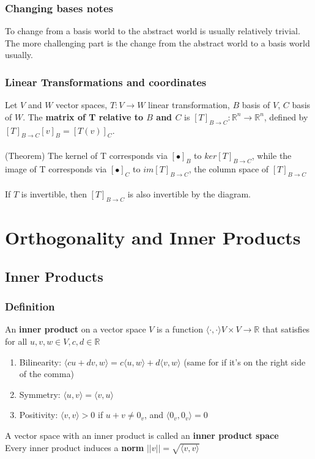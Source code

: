 \documentclass{article}
\begin{document}
\subsubsection{Changing bases notes} %
To change from a basis world to the abstract world is usually relatively trivial. The more challenging part is the change from the abstract world to a basis world usually.
\subsubsection{Linear Transformations and coordinates} %
Let $V$ and $W$ vector spaces, $T:V\rightarrow W$ linear transformation, $B$ basis of $V$, $C$ basis of $W$. The \textbf{matrix of T relative to $B$ and $C$} is $[T]_{B\rightarrow C}:\mathds{R}^n\rightarrow\mathds{R}^n$, defined by $[T]_{B\rightarrow C}[v]_B=[T(v)]_C$.\\\\
(Theorem) The kernel of T corresponds via $[\bullet]_B$ to $ker[T]_{B\rightarrow C}$, while the image of T corresponds via $[\bullet]_C$ to $im[T]_{B\rightarrow C}$, the column space of $[T]_{B\rightarrow C}$\\\\
If $T$ is invertible, then $[T]_{B\rightarrow C}$ is also invertible by the diagram.

\section{Orthogonality and Inner Products} %
\subsection{Inner Products}
\subsubsection{Definition}
An \textbf{inner product} on a vector space $V$ is a function $\langle\cdot,\cdot\rangle V\times V\rightarrow \mathds{R}$ that satisfies for all $u,v,w\in V, c,d\in\mathds{R}$
\begin{enumerate}
    \item Bilinearity: $\langle cu+dv,w\rangle = c\langle u,w\rangle+d\langle v,w\rangle$ (same for if it's on the right side of the comma)
    \item Symmetry: $\langle u,v\rangle = \langle v,u\rangle$
    \item Positivity: $\langle v,v\rangle > 0$ if $u+v\neq 0_v$, and $\langle0_v,0_v\rangle=0$
\end{enumerate}
A vector space with an inner product is called an \textbf{inner product space}\\
Every inner product induces a \textbf{norm} $||v|| = \sqrt{\langle v,v\rangle}$
\end{document}

